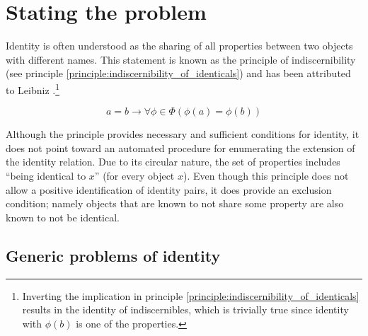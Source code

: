\section{Stating the problem}
\label{sec:stating_the_problem}

Identity is often understood as the sharing of all properties between
  two objects with different names. 
This statement is known as the principle of indiscernibility
  (see principle \ref{principle:indiscernibility_of_identicals})
  and has been attributed to Leibniz \cite{Forrest2010}.\footnote{
    Inverting the implication in
      principle \ref{principle:indiscernibility_of_identicals}
      results in the identity of indiscernibles,
      which is trivially true since identity with $\phi(b)$
      is one of the properties.
    }

\begin{principle}
\label{principle:indiscernibility_of_identicals}
\begin{equation}
    a = b
  \rightarrow
    \forall \phi \in \Phi (\phi(a) = \phi(b)\nonumber)
\end{equation}
\end{principle}

\noindent Although the principle provides necessary and sufficient conditions
  for identity, it does not point toward an automated procedure
  for enumerating the extension of the identity relation.
Due to its circular nature, the set of properties includes
  ``being identical to $x$'' (for every object $x$).
Even though this principle does not
  allow a positive identification of identity pairs,
  it does provide an exclusion condition;
  namely objects that are known to not share some property
  are also known to not be identical.

\subsection{Generic problems of identity}

